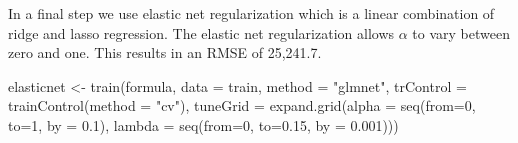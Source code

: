 \documentclass[11pt,a4paper]{article}
\newenvironment{Shaded}{\begin{snugshade}}{\end{snugshade}}
\newcommand{\AttributeTok}[1]{\textcolor[rgb]{0.77,0.63,0.00}{#1}}
\newcommand{\DecValTok}[1]{\textcolor[rgb]{0.00,0.00,0.81}{#1}}
\newcommand{\FloatTok}[1]{\textcolor[rgb]{0.00,0.00,0.81}{#1}}
\newcommand{\FunctionTok}[1]{\textcolor[rgb]{0.00,0.00,0.00}{#1}}
\newcommand{\NormalTok}[1]{#1}
\newcommand{\OtherTok}[1]{\textcolor[rgb]{0.56,0.35,0.01}{#1}}
\newcommand{\StringTok}[1]{\textcolor[rgb]{0.31,0.60,0.02}{#1}}
\begin{document}
In a final step we use elastic net regularization which is a linear
combination of ridge and lasso regression. The elastic net
regularization allows \(\alpha\) to vary between zero and one. This
results in an RMSE of 25,241.7.

\begin{Shaded}
\begin{Highlighting}[]
\NormalTok{elasticnet }\OtherTok{\textless{}{-}} \FunctionTok{train}\NormalTok{(formula, }\AttributeTok{data =}\NormalTok{ train,}
       \AttributeTok{method =} \StringTok{"glmnet"}\NormalTok{, }\AttributeTok{trControl =} \FunctionTok{trainControl}\NormalTok{(}\AttributeTok{method =} \StringTok{"cv"}\NormalTok{),}
       \AttributeTok{tuneGrid =} \FunctionTok{expand.grid}\NormalTok{(}\AttributeTok{alpha =} \FunctionTok{seq}\NormalTok{(}\AttributeTok{from=}\DecValTok{0}\NormalTok{, }\AttributeTok{to=}\DecValTok{1}\NormalTok{, }\AttributeTok{by =} \FloatTok{0.1}\NormalTok{),}
       \AttributeTok{lambda =} \FunctionTok{seq}\NormalTok{(}\AttributeTok{from=}\DecValTok{0}\NormalTok{, }\AttributeTok{to=}\FloatTok{0.15}\NormalTok{, }\AttributeTok{by =} \FloatTok{0.001}\NormalTok{)))}
\end{Highlighting}
\end{Shaded}
\end{document}
